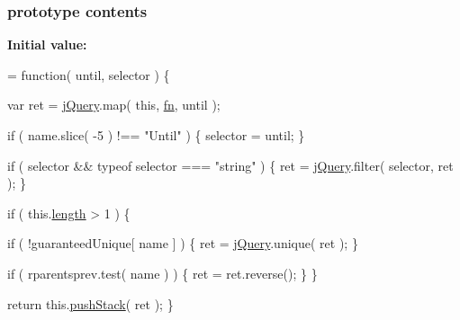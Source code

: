 \subsubsection[{contents}]{ {\bf prototype} contents}\label{jquery-1_810_82-vsdoc_8js_af81eeab332c74dc521f6610f4914badd}
{\bfseries Initial value\+:}
\begin{DoxyCode}
= \textcolor{keyword}{function}( until, selector ) \{


        var ret = \hyperlink{jquery-1_810_82-vsdoc_8js_add5237586d970a38a81f990e8eb28c6c}{jQuery}.map( \textcolor{keyword}{this}, \hyperlink{jquery-1_810_82-vsdoc_8js_acef6bdaf6b9b20fdcca1ea86f0902c3b}{fn}, until );

        \textcolor{keywordflow}{if} ( name.slice( -5 ) !== \textcolor{stringliteral}{"Until"} ) \{
            selector = until;
        \}

        \textcolor{keywordflow}{if} ( selector && typeof selector === \textcolor{stringliteral}{"string"} ) \{
            ret = \hyperlink{jquery-1_810_82-vsdoc_8js_add5237586d970a38a81f990e8eb28c6c}{jQuery}.filter( selector, ret );
        \}

        \textcolor{keywordflow}{if} ( this.\hyperlink{jquery-1_810_82-vsdoc_8js_aa7de35d58da66d9944ab9cbe82c19640}{length} > 1 ) \{
            
            \textcolor{keywordflow}{if} ( !guaranteedUnique[ name ] ) \{
                ret = \hyperlink{jquery-1_810_82-vsdoc_8js_add5237586d970a38a81f990e8eb28c6c}{jQuery}.unique( ret );
            \}

            
            \textcolor{keywordflow}{if} ( rparentsprev.test( name ) ) \{
                ret = ret.reverse();
            \}
        \}

        \textcolor{keywordflow}{return} this.\hyperlink{jquery-1_810_82-vsdoc_8js_afc3a7db1ef2b526338c06c07cecccd44}{pushStack}( ret );
    \}
\end{DoxyCode}
\hypertarget{jquery-1_810_82-vsdoc_8js_afb948baf7821b3f288133d6f9b8da16d}{}
